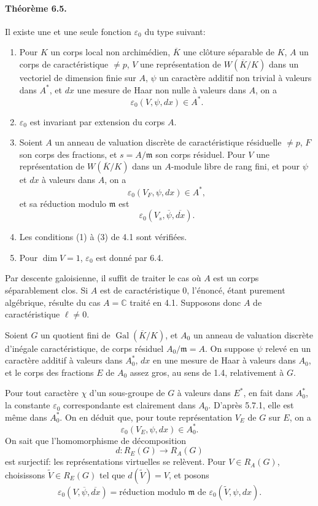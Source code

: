 \documentclass[10pt]{article}
\newcommand{\C}{\mathbb C}
\newcommand{\Gal}{\operatorname{Gal}}
\providecommand{\Gal}{\operatorname{Gal}}
\providecommand{\Gal}{\operatorname{Gal}}
\providecommand{\Gal}{\operatorname{Gal}}
\providecommand{\Gal}{\operatorname{Gal}}
\begin{document}
\paragraph{Théorème 6.5.} Il existe une et une seule fonction \(\varepsilon_0\) du type suivant:
\begin{enumerate}[label=(\alph*)]
\item Pour \(K\) un corps local non archimédien, \(\overline K\) une clôture séparable de \(K\), \(A\) un corps de caractéristique \(\ne p\), \(V\) une représentation de \(W(\overline K/K)\) dans un vectoriel de dimension finie sur \(A\), \(\psi\) un caractère additif non trivial à valeurs dans \(A^*\), et \(dx\) une mesure de Haar non nulle à valeurs dans \(A\), on a
\[
\varepsilon_0(V,\psi,dx)\in A^*.
\]
\item \(\varepsilon_0\) est invariant par extension du corps \(A\).
\item Soient \(A\) un anneau de valuation discrète de caractéristique résiduelle \(\ne p\), \(F\) son corps des fractions, et \(s=A/\mathfrak m\) son corps résiduel. Pour \(V\) une représentation de \(W(\overline K/K)\) dans un \(A\)-module libre de rang fini, et pour \(\psi\) et \(dx\) à valeurs dans \(A\), on a
\[
\varepsilon_0(V_F,\psi,dx)\in A^*,
\]
et sa réduction modulo \(\mathfrak m\) est
\[
\varepsilon_0(V_s,\overline\psi,\overline{dx}).
\]
\item Les conditions (1) à (3) de 4.1 sont vérifiées.
\item Pour \(\dim V=1\), \(\varepsilon_0\) est donné par 6.4.
\end{enumerate}

Par descente galoisienne, il suffit de traiter le cas où \(A\) est un corps séparablement clos. Si \(A\) est de caractéristique \(0\), l'énoncé, étant purement algébrique, résulte du cas \(A=\C\) traité en 4.1. Supposons donc \(A\) de caractéristique \(\ell\ne0\).

Soient \(G\) un quotient fini de \(\Gal(\overline K/K)\), et \(A_0\) un anneau de valuation discrète d'inégale caractéristique, de corps résiduel \(A_0/\mathfrak m=A\). On suppose \(\psi\) relevé en un caractère additif à valeurs dans \(A_0^*\), \(dx\) en une mesure de Haar à valeurs dans \(A_0\), et le corps des fractions \(E\) de \(A_0\) assez gros, au sens de 1.4, relativement à \(G\).

Pour tout caractère \(\chi\) d'un sous-groupe de \(G\) à valeurs dans \(E^*\), en fait dans \(A_0^*\), la constante \(\varepsilon_0\) correspondante est clairement dans \(A_0\). D'après 5.7.1, elle est même dans \(A_0^*\). On en déduit que, pour toute représentation \(V_E\) de \(G\) sur \(E\), on a
\[
\varepsilon_0(V_E,\psi,dx)\in A_0^*.
\]
On sait que l'homomorphisme de décomposition
\[
d:R_E(G)\longrightarrow R_A(G)
\]
est surjectif: les représentations virtuelles se relèvent. Pour \(V\in R_A(G)\), choisissons \(\widetilde V\in R_E(G)\) tel que \(d(\widetilde V)=V\), et posons
\[
\varepsilon_0(V,\overline\psi,\overline{dx})
=
\text{réduction modulo }\mathfrak m\text{ de }
\varepsilon_0(\widetilde V,\psi,dx).
\]
\end{document}
